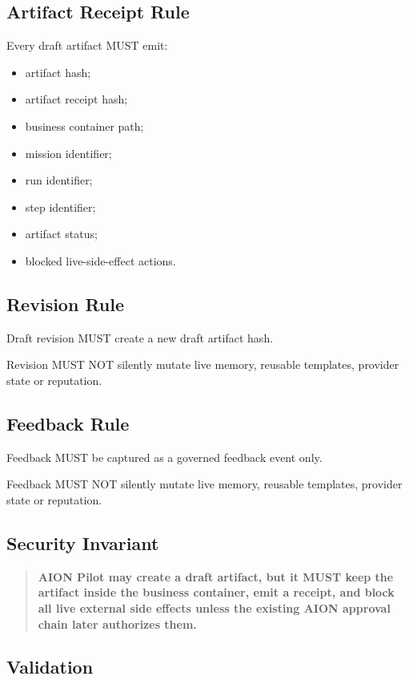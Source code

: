 \subsection{Artifact Receipt Rule}

Every draft artifact MUST emit:

\begin{itemize}
  \item artifact hash;
  \item artifact receipt hash;
  \item business container path;
  \item mission identifier;
  \item run identifier;
  \item step identifier;
  \item artifact status;
  \item blocked live-side-effect actions.
\end{itemize}

\subsection{Revision Rule}

Draft revision MUST create a new draft artifact hash.

Revision MUST NOT silently mutate live memory, reusable templates, provider state or reputation.

\subsection{Feedback Rule}

Feedback MUST be captured as a governed feedback event only.

Feedback MUST NOT silently mutate live memory, reusable templates, provider state or reputation.

\subsection{Security Invariant}

\begin{quote}
\textbf{AION Pilot may create a draft artifact, but it MUST keep the artifact inside the business container, emit a receipt, and block all live external side effects unless the existing AION approval chain later authorizes them.}
\end{quote}

\subsection{Validation}

